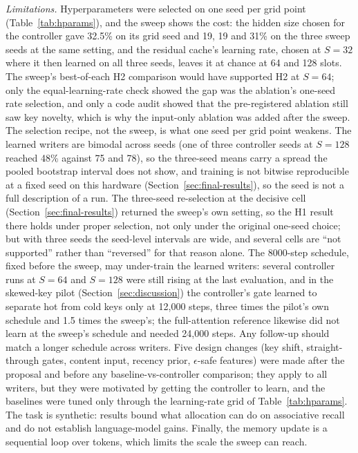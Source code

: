 \documentclass[conference]{IEEEtran}
\begin{document}
\textit{Limitations.} Hyperparameters were selected on one seed per grid
point (Table~\ref{tab:hparams}), and the sweep shows the cost: the hidden size
chosen for the controller gave 32.5\% on its grid seed and 19, 19 and 31\% on
the three sweep seeds at the same setting, and the residual cache's learning rate,
chosen at $S = 32$ where it then learned on all three seeds, leaves it at
chance at 64 and 128 slots. The sweep's best-of-each H2 comparison would have
supported H2 at $S = 64$; only the equal-learning-rate check showed the gap
was the ablation's one-seed rate selection, and only a code audit showed that
the pre-registered ablation still saw key novelty, which is why the input-only
ablation was added after the sweep. The selection recipe, not the
sweep, is what one seed per grid point weakens. The learned writers
are bimodal across seeds (one of three controller seeds at $S = 128$ reached
48\% against 75 and 78), so the three-seed means carry a spread the pooled
bootstrap interval does not show, and training is not bitwise reproducible at
a fixed seed on this hardware (Section~\ref{sec:final-results}), so the seed
is not a full description of a run. The three-seed re-selection at the
decisive cell (Section~\ref{sec:final-results}) returned the sweep's own
setting, so the H1 result there holds under proper selection, not only under
the original one-seed choice; but with three seeds the seed-level intervals
are wide, and several cells are ``not supported'' rather than ``reversed''
for that reason alone. The 8000-step schedule, fixed before the sweep, may
under-train the learned writers: several controller runs at $S = 64$ and
$S = 128$ were still rising at the last evaluation, and in the skewed-key pilot
(Section~\ref{sec:discussion}) the controller's gate learned to separate hot
from cold keys only at 12{,}000 steps, three times the pilot's own schedule
and 1.5 times the sweep's; the full-attention reference likewise did not learn
at the sweep's schedule and needed 24{,}000 steps. Any follow-up should match
a longer schedule across writers. Five design changes (key shift, straight-through gates,
content input, recency prior, $\epsilon$-safe features) were made after the
proposal and before any baseline-vs-controller comparison; they apply to all
writers, but they were motivated by getting the controller to learn, and the
baselines were tuned only through the learning-rate grid of
Table~\ref{tab:hparams}. The task is
synthetic: results bound what allocation can do on associative recall and do
not establish language-model gains. Finally, the memory update is a sequential
loop over tokens, which limits the scale the sweep can reach.
\end{document}
